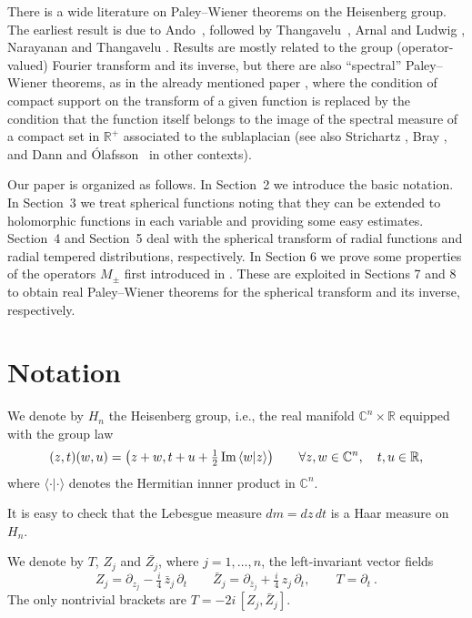 \documentclass[12pt,a4paper]{amsart}
\theoremstyle{plain}
\theoremstyle{definition}
\numberwithin{equation}{section}
\begin{document}
There is a wide literature on Paley--Wiener theorems on the Heisenberg group. 
The earliest result is due to Ando~\cite{PJapAc},
followed by
 Thangavelu~\cite{Revista,JFA,HirMJ}, 
Arnal and Ludwig \cite{PAMS},
 Narayanan and Thangavelu \cite{AnnIFour}.
  Results are mostly  related to the group (operator-valued) Fourier transform 
 and its inverse, but there are also ``spectral'' Paley--Wiener theorems,
  as in the already mentioned paper \cite{MN}, where the condition of compact support 
  on the transform of a given function is replaced 
 by the condition that the function itself belongs to the image of the 
 spectral measure of a compact set in ${\mathbb R}^+$ 
 associated to the sublaplacian (see also Strichartz \cite{JFA-Laplacians},
  Bray \cite{Monats.M},
 and Dann and \'Olafsson~\cite{Olaf} in other contexts).
  
Our paper is organized as follows. In Section~2 we introduce the basic notation. In Section~3 we treat spherical functions
noting that they can be extended to holomorphic functions in each variable
and providing some easy estimates. Section~4 and Section~5 deal 
with the spherical transform of radial functions and radial tempered distributions, respectively. 
In Section 6 we prove some properties of  the operators $M_\pm$
first introduced in \cite{BJR}.
These are exploited in Sections 7 and 8 to obtain real Paley--Wiener theorems
for the spherical transform and its inverse, respectively.

\section{Notation}
We denote by ${{H_{n}}}$ the Heisenberg group, i.e.,
the real manifold ${\mathbb C}^{n}\times{\mathbb R}$ equipped with the group law
$$
(z,t)(w,u)=\bigl(z+w,t+u+\tfrac12\,{\text{\rm Im}\,} \langle w | z \rangle \bigr)
\qquad\forall z,w\in {\mathbb C}^{n},\quad
t,u\in {\mathbb R},
$$
where $\langle\cdot|\cdot\rangle$ denotes the Hermitian innner product in ${\mathbb C}^{n}$.

It is easy to check that the Lebesgue measure $dm=dz\,dt$ is a Haar measure on ${{H_{n}}}$.
\medskip

We denote by $T$, $Z_j$ and $\bar{ Z_j}$, where $j=1,\ldots,{n}$,
the left-invariant vector fields
$$
Z_j=\partial_{z_j}-\tfrac{i}{4}\, \bar{z}_j\,\partial_t
\qquad
\bar{Z}_j=\partial_{\bar{z}_j}+\tfrac{i}{4}\, z_j\,\partial_t ,
\qquad T=\partial_t\ .
$$
The only nontrivial brackets are $T=-2i\,[Z_j,\bar Z_j]$.
\end{document}

